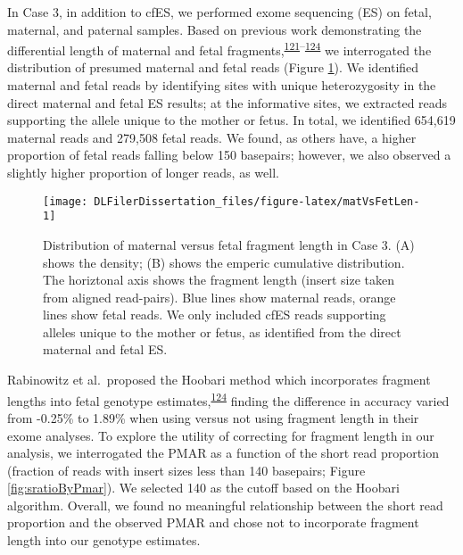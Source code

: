 \documentclass[11pt,letterpaper]{book}
\begin{document}
In Case 3, in addition to cfES, we performed exome sequencing (ES) on fetal, maternal, and paternal samples.
Based on previous work demonstrating the differential length of maternal and fetal fragments,\textsuperscript{\protect\hyperlink{ref-chan:2004aa}{121}--\protect\hyperlink{ref-rabinowitz:2019aa}{124}} we interrogated the distribution of presumed maternal and fetal reads (Figure \ref{fig:matVsFetLen}).
We identified maternal and fetal reads by identifying sites with unique heterozygosity in the direct maternal and fetal ES results; at the informative sites, we extracted reads supporting the allele unique to the mother or fetus.
In total, we identified 654,619 maternal reads and 279,508 fetal reads.
We found, as others have, a higher proportion of fetal reads falling below 150 basepairs; however, we also observed a slightly higher proportion of longer reads, as well.





\begin{figure}

{\centering \texttt{[image: DLFilerDissertation\_files/figure-latex/matVsFetLen-1]} 

}

\caption[Distribution of maternal versus fetal fragment length in Case 3.]{Distribution of maternal versus fetal fragment length in Case 3. (A) shows the density; (B) shows the emperic cumulative distribution. The horiztonal axis shows the fragment length (insert size taken from aligned read-pairs). Blue lines show maternal reads, orange lines show fetal reads. We only included cfES reads supporting alleles unique to the mother or fetus, as identified from the direct maternal and fetal ES.}\label{fig:matVsFetLen}
\end{figure}

Rabinowitz et al.~proposed the Hoobari method which incorporates fragment lengths into fetal genotype estimates,\textsuperscript{\protect\hyperlink{ref-rabinowitz:2019aa}{124}} finding the difference in accuracy varied from -0.25\% to 1.89\% when using versus not using fragment length in their exome analyses.
To explore the utility of correcting for fragment length in our analysis, we interrogated the PMAR as a function of the short read proportion (fraction of reads with insert sizes less than 140 basepairs; Figure \ref{fig:sratioByPmar}).
We selected 140 as the cutoff based on the Hoobari algorithm.
Overall, we found no meaningful relationship between the short read proportion and the observed PMAR and chose not to incorporate fragment length into our genotype estimates.
\end{document}
